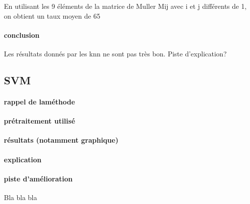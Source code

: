 \documentclass[a4paper,10pt]{report}
\begin{document}
En utilisant les 9 éléments de la matrice de Muller Mij avec i et j différents de 1, on obtient un taux moyen de 65%
\paragraph{conclusion}
Les résultats donnés par les knn ne sont pas très bon. Piste d'explication?

\subsection{SVM}
\paragraph{rappel de laméthode}
\paragraph{prétraitement utilisé}
\paragraph{résultats (notamment graphique)}
\paragraph{explication}
\paragraph{piste d'amélioration}
\tableofcontents


Bla bla bla

\listoffigures
\listoftables
\printindex
\end{document}
